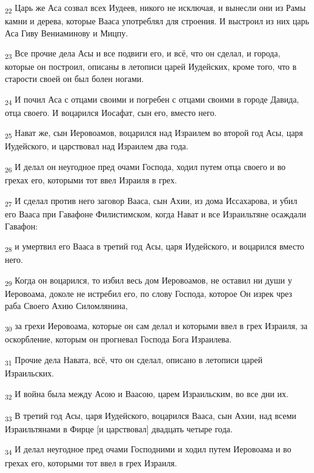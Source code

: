 \begin{tcolorbox}
\textsubscript{22} Царь же Аса созвал всех Иудеев, никого не исключая, и вынесли они из Рамы камни и дерева, которые Вааса употреблял для строения. И выстроил из них царь Аса Гиву Вениаминову и Мицпу.
\end{tcolorbox}
\begin{tcolorbox}
\textsubscript{23} Все прочие дела Асы и все подвиги его, и всё, что он сделал, и города, которые он построил, описаны в летописи царей Иудейских, кроме того, что в старости своей он был болен ногами.
\end{tcolorbox}
\begin{tcolorbox}
\textsubscript{24} И почил Аса с отцами своими и погребен с отцами своими в городе Давида, отца своего. И воцарился Иосафат, сын его, вместо него.
\end{tcolorbox}
\begin{tcolorbox}
\textsubscript{25} Нават же, сын Иеровоамов, воцарился над Израилем во второй год Асы, царя Иудейского, и царствовал над Израилем два года.
\end{tcolorbox}
\begin{tcolorbox}
\textsubscript{26} И делал он неугодное пред очами Господа, ходил путем отца своего и во грехах его, которыми тот ввел Израиля в грех.
\end{tcolorbox}
\begin{tcolorbox}
\textsubscript{27} И сделал против него заговор Вааса, сын Ахии, из дома Иссахарова, и убил его Вааса при Гавафоне Филистимском, когда Нават и все Израильтяне осаждали Гавафон:
\end{tcolorbox}
\begin{tcolorbox}
\textsubscript{28} и умертвил его Вааса в третий год Асы, царя Иудейского, и воцарился вместо него.
\end{tcolorbox}
\begin{tcolorbox}
\textsubscript{29} Когда он воцарился, то избил весь дом Иеровоамов, не оставил ни души у Иеровоама, доколе не истребил его, по слову Господа, которое Он изрек чрез раба Своего Ахию Силомлянина,
\end{tcolorbox}
\begin{tcolorbox}
\textsubscript{30} за грехи Иеровоама, которые он сам делал и которыми ввел в грех Израиля, за оскорбление, которым он прогневал Господа Бога Израилева.
\end{tcolorbox}
\begin{tcolorbox}
\textsubscript{31} Прочие дела Навата, всё, что он сделал, описано в летописи царей Израильских.
\end{tcolorbox}
\begin{tcolorbox}
\textsubscript{32} И война была между Асою и Ваасою, царем Израильским, во все дни их.
\end{tcolorbox}
\begin{tcolorbox}
\textsubscript{33} В третий год Асы, царя Иудейского, воцарился Вааса, сын Ахии, над всеми Израильтянами в Фирце [и царствовал] двадцать четыре года.
\end{tcolorbox}
\begin{tcolorbox}
\textsubscript{34} И делал неугодное пред очами Господними и ходил путем Иеровоама и во грехах его, которыми тот ввел в грех Израиля.
\end{tcolorbox}
